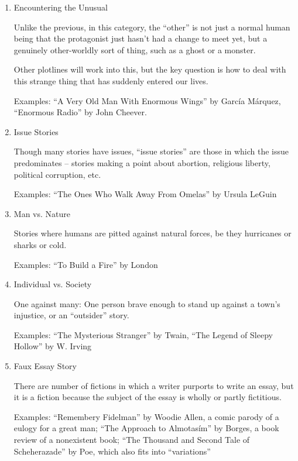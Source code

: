\documentclass[12pt]{article}
\newcommand{\litem}[1]{\item{\large #1} \nopagebreak}
\newcommand{\eg}{Examples: }
\newcommand{\book}[1]{\textit{#1}}
\newcommand{\story}[1]{``#1''}
\begin{document}
\begin{enumerate}
\eg \book{The Prince and the Pauper} by Twain, \book{The
Chosen} by Potok



\litem{Encountering the Unusual}

Unlike the previous, in this category, the ``other'' is not
just a normal human being that the protagonist just hasn't
had a change to meet yet, but a genuinely other-worldly sort
of thing, such as a ghost or a monster.

Other plotlines will work into this, but the key question is
how to deal with this strange thing that has suddenly
entered our lives.

\eg \story{A Very Old Man With Enormous Wings} by Garc\'ia
M\'arquez, \story{Enormous Radio} by John Cheever.



\litem{Issue Stories}

Though many stories have issues, ``issue stories'' are those
in which the issue predominates -- stories making a point
about abortion, religious liberty, political corruption,
etc.

\eg \story{The Ones Who Walk Away From Omelas} by Ursula
LeGuin



\litem{Man vs. Nature}

Stories where humans are pitted against natural forces, be
they hurricanes or sharks or cold.

\eg \story{To Build a Fire} by London



\litem{Individual vs. Society}

One against many: One person brave enough to stand up
against a town's injustice, or an ``outsider'' story.

\eg \story{The Mysterious Stranger} by Twain, \story{The
Legend of Sleepy Hollow} by W. Irving



\litem{Faux Essay Story}

There are number of fictions in which a writer purports to
write an essay, but it is a fiction because the subject of
the essay is wholly or partly fictitious.

\eg \story{Remembery Fidelman} by Woodie Allen, a comic
parody of a eulogy for a great man; \story{The Approach to
Almotas\'im} by Borges, a book review of a nonexistent
book; \story{The Thousand and Second Tale of Scheherazade}
by Poe, which also fits into ``variations''




\end{enumerate}
\end{document}
